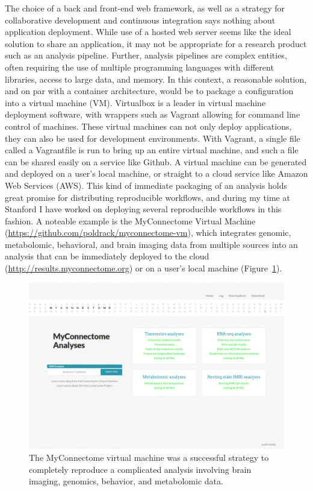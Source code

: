 \documentclass{report}
\begin{document}
The choice of a back and front-end web framework, as well as a strategy
for collaborative development and continuous integration says nothing
about application deployment. While use of a hosted web server seems
like the ideal solution to share an application, it may not be
appropriate for a research product such as an analysis pipeline.
Further, analysis pipelines are complex entities, often requiring the
use of multiple programming languages with different libraries, access
to large data, and memory. In this context, a reasonable solution, and
on par with a container architecture, would be to package a
configuration into a virtual machine (VM). Virtualbox \cite{noauthor_undated-id} is
a leader in virtual machine deployment software, with wrappers such as
Vagrant \cite{noauthor_undated-tk} allowing
for command line control of machines. These virtual machines can not
only deploy applications, they can also be used for development
environments. With Vagrant, a single file called a Vagrantfile is run to
bring up an entire virtual machine, and such a file can be shared easily
on a service like Github. A virtual machine can be generated and
deployed on a user's local machine, or straight to a cloud service like
Amazon Web Services (AWS). This kind of immediate packaging of an
analysis holds great promise for distributing reproducible workflows,
and during my time at Stanford I have worked on deploying several
reproducible workflows in this fashion. A noteable example is the
MyConnectome Virtual Machine
(\href{https://github.com/poldrack/myconnectome-vm}{https://github.com/poldrack/myconnectome-vm}),
which integrates genomic, metabolomic, behavioral, and brain imaging
data from multiple sources into an analysis that can be immediately
deployed to the cloud
(\href{http://results.myconnectome.org}{http://results.myconnectome.org})
or on a user's local machine (Figure~\ref{fig:53}).

\begin{figure}[h!]
\begin{center}
\includegraphics[width=15cm]{images/figure53.png}
\end{center}
 \caption{\label{fig:53} The MyConnectome virtual machine was a successful strategy
to completely reproduce a complicated analysis involving brain imaging,
genomics, behavior, and metabolomic data.}
\end{figure}
\end{document}
